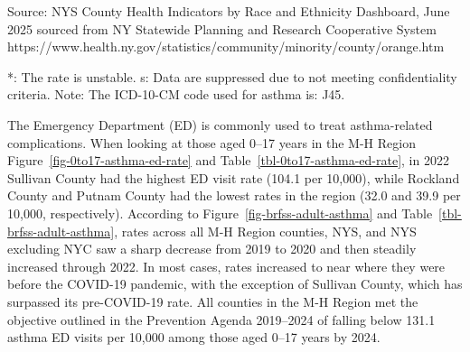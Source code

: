 \documentclass[
  english,
  letterpaper,
]{report}
\begin{document}
\begin{tcolorbox}[enhanced jigsaw, breakable, leftrule=.75mm, title=\textcolor{quarto-callout-note-color}{\faInfo}\hspace{0.5em}{Source}, bottomrule=.15mm, opacityback=0, left=2mm, colback=white, bottomtitle=1mm, coltitle=black, colbacktitle=quarto-callout-note-color!10!white, colframe=quarto-callout-note-color-frame, opacitybacktitle=0.6, toptitle=1mm, titlerule=0mm, arc=.35mm, rightrule=.15mm, toprule=.15mm]

Source: NYS County Health Indicators by Race and Ethnicity Dashboard,
June 2025 sourced from NY Statewide Planning and Research Cooperative
System
https://www.health.ny.gov/statistics/community/minority/county/orange.htm

\end{tcolorbox}

\begin{tcolorbox}[enhanced jigsaw, breakable, leftrule=.75mm, title=\textcolor{quarto-callout-note-color}{\faInfo}\hspace{0.5em}{Note}, bottomrule=.15mm, opacityback=0, left=2mm, colback=white, bottomtitle=1mm, coltitle=black, colbacktitle=quarto-callout-note-color!10!white, colframe=quarto-callout-note-color-frame, opacitybacktitle=0.6, toptitle=1mm, titlerule=0mm, arc=.35mm, rightrule=.15mm, toprule=.15mm]

*: The rate is unstable. s: Data are suppressed due to not meeting
confidentiality criteria. Note: The ICD-10-CM code used for asthma is:
J45.

\end{tcolorbox}

The Emergency Department (ED) is commonly used to treat asthma-related
complications. When looking at those aged 0--17 years in the M-H Region
Figure~\ref{fig-0to17-asthma-ed-rate} and
Table~\ref{tbl-0to17-asthma-ed-rate}, in 2022 Sullivan County had the
highest ED visit rate (104.1 per 10,000), while Rockland County and
Putnam County had the lowest rates in the region (32.0 and 39.9 per
10,000, respectively). According to Figure~\ref{fig-brfss-adult-asthma}
and Table~\ref{tbl-brfss-adult-asthma}, rates across all M-H Region
counties, NYS, and NYS excluding NYC saw a sharp decrease from 2019 to
2020 and then steadily increased through 2022. In most cases, rates
increased to near where they were before the COVID-19 pandemic, with the
exception of Sullivan County, which has surpassed its pre-COVID-19 rate.
All counties in the M-H Region met the objective outlined in the
Prevention Agenda 2019--2024 of falling below 131.1 asthma ED visits per
10,000 among those aged 0--17 years by 2024.
\end{document}
